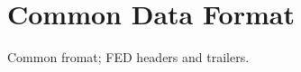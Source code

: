 \section{Common Data Format}\label{sec:CommonFormat}
 
Common fromat; FED headers and trailers.





